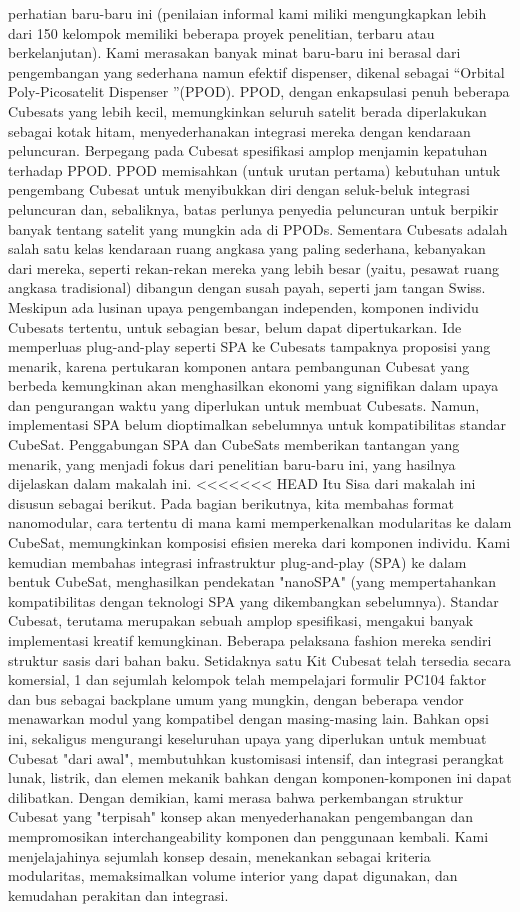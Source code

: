 perhatian baru-baru ini (penilaian informal kami miliki
mengungkapkan lebih dari 150 kelompok memiliki beberapa proyek penelitian,
terbaru atau berkelanjutan). Kami merasakan banyak minat baru-baru ini
berasal dari pengembangan yang sederhana namun efektif
dispenser, dikenal sebagai “Orbital Poly-Picosatelit
Dispenser ”(PPOD). PPOD, dengan enkapsulasi penuh
beberapa Cubesats yang lebih kecil, memungkinkan seluruh satelit berada
diperlakukan sebagai kotak hitam, menyederhanakan integrasi mereka
dengan kendaraan peluncuran. Berpegang pada Cubesat
spesifikasi amplop menjamin kepatuhan terhadap
PPOD. PPOD memisahkan (untuk urutan pertama) kebutuhan
untuk pengembang Cubesat untuk menyibukkan diri dengan
seluk-beluk integrasi peluncuran dan, sebaliknya, batas
perlunya penyedia peluncuran untuk berpikir banyak tentang
satelit yang mungkin ada di PPODs.
Sementara Cubesats adalah salah satu kelas kendaraan ruang angkasa yang paling sederhana, kebanyakan dari mereka, seperti rekan-rekan mereka yang lebih besar (yaitu, pesawat ruang angkasa tradisional) dibangun dengan susah payah, seperti jam tangan Swiss. Meskipun ada lusinan upaya pengembangan independen, komponen individu Cubesats tertentu, untuk sebagian besar, belum dapat dipertukarkan. Ide memperluas plug-and-play seperti SPA ke Cubesats tampaknya proposisi yang menarik, karena pertukaran komponen antara pembangunan Cubesat yang berbeda kemungkinan akan menghasilkan ekonomi yang signifikan dalam upaya dan pengurangan waktu yang diperlukan untuk membuat Cubesats. Namun, implementasi SPA belum dioptimalkan sebelumnya untuk kompatibilitas standar CubeSat. Penggabungan SPA dan CubeSats memberikan tantangan yang menarik, yang menjadi fokus dari penelitian baru-baru ini, yang hasilnya dijelaskan dalam makalah ini.
<<<<<<< HEAD
Itu Sisa dari makalah ini disusun sebagai berikut. Pada bagian berikutnya, kita membahas format nanomodular, cara tertentu di mana kami memperkenalkan modularitas ke dalam CubeSat, memungkinkan komposisi efisien mereka dari komponen individu. Kami kemudian membahas integrasi infrastruktur plug-and-play (SPA) ke dalam bentuk CubeSat, menghasilkan pendekatan "nanoSPA" (yang mempertahankan kompatibilitas dengan teknologi SPA yang dikembangkan sebelumnya). 
Standar Cubesat, terutama merupakan sebuah amplop spesifikasi, mengakui banyak implementasi kreatif kemungkinan. Beberapa pelaksana fashion mereka sendiri struktur sasis dari bahan baku. Setidaknya satu Kit Cubesat telah tersedia secara komersial, 1 dan sejumlah kelompok telah mempelajari formulir PC104 faktor dan bus sebagai backplane umum yang mungkin, dengan beberapa vendor menawarkan modul yang kompatibel dengan masing-masing lain. Bahkan opsi ini, sekaligus mengurangi keseluruhan upaya yang diperlukan untuk membuat Cubesat "dari awal", membutuhkan kustomisasi intensif, dan integrasi perangkat lunak, listrik, dan elemen mekanik bahkan dengan komponen-komponen ini dapat dilibatkan. Dengan demikian, kami merasa bahwa perkembangan struktur Cubesat yang "terpisah" konsep akan menyederhanakan pengembangan dan mempromosikan interchangeability komponen dan penggunaan kembali. Kami menjelajahinya sejumlah konsep desain, menekankan sebagai kriteria modularitas, memaksimalkan volume interior yang dapat digunakan, dan kemudahan perakitan dan integrasi.
